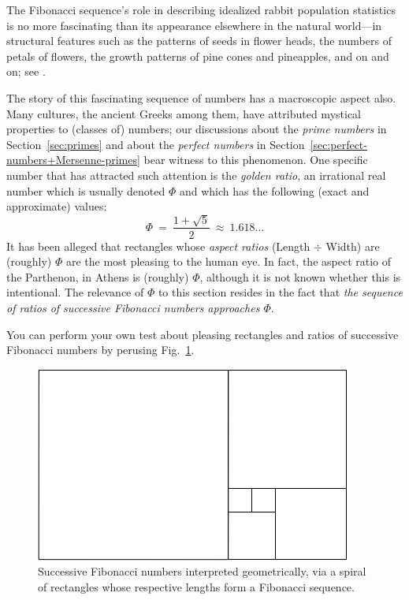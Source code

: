 The Fibonacci sequence's role in describing idealized rabbit
population statistics is no more fascinating than its appearance
elsewhere in the natural world---in structural features such as the
patterns of seeds in flower heads, the numbers of petals of flowers,
the growth patterns of pine cones and pineapples, and on and on; see
\cite{Basin63}.

The story of this fascinating sequence of numbers has a macroscopic
aspect also.  Many cultures, the ancient Greeks among them, have
attributed mystical properties to (classes of) numbers; our
discussions about the {\it prime numbers} in Section~\ref{sec:primes}
and about the {\it perfect numbers} in
Section~\ref{sec:perfect-numbers+Mersenne-primes} bear witness to this
phenomenon.  One specific number that has attracted such attention is
the {\it golden ratio}, an irrational real number which is usually
denoted $\Phi$ and which has the following (exact and approximate)
values:  
\[ \Phi \ = \ \frac{1+\sqrt{5}}{2} \ \approx \  1.618\ldots \]
It has been alleged that rectangles whose {\it aspect ratios} (Length
$\div$ Width) are (roughly) $\Phi$ are the most pleasing to the human
eye.  In fact, the aspect ratio of the Parthenon, in Athens is
(roughly) $\Phi$, although it is not known whether this is
intentional.  The relevance of $\Phi$ to this section resides in the
fact that {\em the sequence of ratios of successive Fibonacci numbers
approaches $\Phi$}.

You can perform your own test about pleasing rectangles and ratios of
successive Fibonacci numbers by perusing Fig.~\ref{fig:fibosquare}.
\begin{figure}[htb]
\begin{center}
        \includegraphics[scale=0.5]{FiguresMaths//Fiboembedded}
\caption{Successive Fibonacci numbers interpreted geometrically, via a
  spiral of rectangles whose respective lengths form a Fibonacci
  sequence.}
        \label{fig:fibosquare}
\end{center}
\end{figure}

